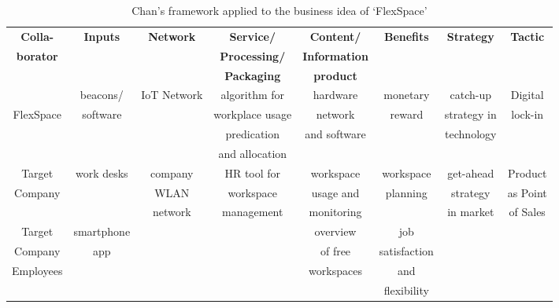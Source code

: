 			\begin{table}[!htb]
			\scriptsize
			\centering			
			\caption{Chan's framework applied to the business idea of `FlexSpace'}
			\label{tab:use_case_chan}
			\centering
			\vspace{0.2cm}
			               
			\begin{tabular}{| c | c | c | c | c | c | c | c |}
			\hline
			\rule{0pt}{8pt}
			\textbf{Colla-} 	& \textbf{Inputs} & \textbf{Network} & \textbf{Service/}    & \textbf{Content/}    & \textbf{Benefits} & \textbf{Strategy} & \textbf{Tactic}\\
			\textbf{borator}  	&                 &                  & \textbf{Processing/} & \textbf{Information} &                   &                   & \\
			                    &                 &                  & \textbf{Packaging}   & \textbf{product}     &                   &                   & \\         
			\hline
			 		  & beacons/ & IoT Network & algorithm for   & hardware 	& monetary  & catch-up    & Digital \\
			FlexSpace & software &             & workplace usage & network      & reward    & strategy in & lock-in \\
			          &          &             & predication     & and software &           & technology  &         \\
			          &          &             & and allocation  &              &           &             &         \\
			\hline
			Target	  & work desks & company   & HR tool for     & workspace    & workspace & get-ahead	  & Product  \\
			Company   &            & WLAN      & workspace       & usage and    & planning  & strategy    & as Point \\
			          &            & network   & management      & monitoring   &           & in market   & of Sales \\
			\hline
			Target	  & smartphone &           &                 & overview     & job          &           &         \\
			Company   & app        &           &                 & of free      & satisfaction &           &         \\
			Employees &			   &           &                 & workspaces   & and	       &           &         \\
					  &			   &		   &				 &				& flexibility  &           &         \\
			\hline
			\end{tabular}
			\end{table}
